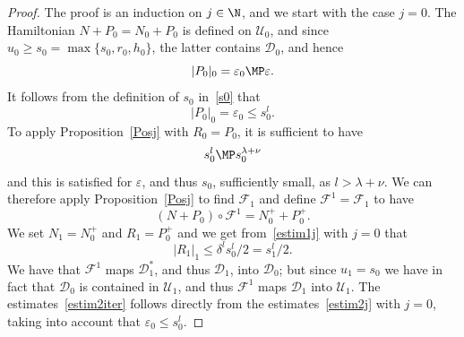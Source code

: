 \begin{proof}
The proof is an induction on $j \in \N$, and we start with the case $j=0$. The Hamiltonian $N+P_0=N_0+P_0$ is defined on $\mathcal{U}_0$, and since $u_0 \geq s_0=\max\{s_0,r_0,h_0\}$, the latter contains $\mathcal{D}_0$, and hence
\[ |P_0|_0=\varepsilon_0\MP \varepsilon. \]
It follows from the definition of $s_0$ in~\eqref{s0} that
\[ |P_0|_0=\varepsilon_0\leq s_0^l. \]
To apply Proposition~\ref{Posj} with $R_0=P_0$, it is sufficient to have
\begin{equation*}
s_0^l \MP s_0^{\lambda+\nu}
\end{equation*}
and this is satisfied for $\varepsilon$, and thus $s_0$, sufficiently small, as $l>\lambda+\nu$. We can therefore apply Proposition~\ref{Posj} to find $\mathcal{F}_1$ and define $\mathcal{F}^1=\mathcal{F}_1$ to have
\[(N+P_0) \circ \mathcal{F}^1=N_0^++P_0^+. \]
We set $N_1=N_0^+$ and $R_1=P_0^+$ and we get from~\eqref{estim1j} with $j=0$ that
\[ |R_1|_1 \leq \delta^ls_0^l/2= s_1^l/2. \]
We have that $\mathcal{F}^1$ maps $\mathcal{D}_1^*$, and thus $\mathcal{D}_1$, into $\mathcal{D}_0$; but since $u_1=s_0$ we have in fact that $\mathcal{D}_0$ is contained in $\mathcal{U}_1$, and thus $\mathcal{F}^1$ maps $\mathcal{D}_1$ into $\mathcal{U}_1$. The estimates~\eqref{estim2iter} follows directly from the estimates~\eqref{estim2j} with $j=0$, taking into account that $\varepsilon_0\leq s_0^l$.


\end{proof}
